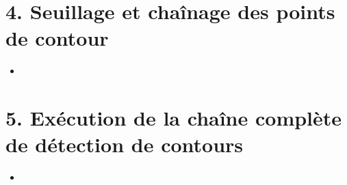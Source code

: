 \documentclass{article}
\begin{document}
\begin{itemize}

	
\begin{lstlisting}

\end{lstlisting}

\end{itemize}

\section*{4. Seuillage et chaînage des points de contour}

\begin{itemize}\renewcommand{\labelitemi}{$\bullet$}
	\item
	
\begin{lstlisting}

\end{lstlisting}

\end{itemize}

\section*{5. Exécution de la chaîne complète de détection de contours}

\begin{itemize}\renewcommand{\labelitemi}{$\bullet$}
	\item
	
\begin{lstlisting}

\end{lstlisting}

\end{itemize}
\end{document}
